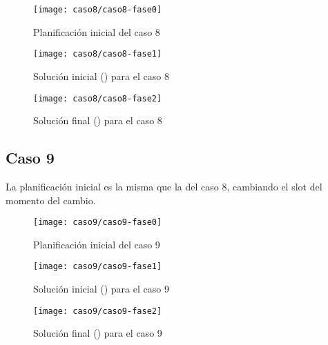 \begin{figure}[!h]
	\centering
	\texttt{[image: caso8/caso8-fase0]}
	\caption{Planificación inicial del caso 8}
	\label{fig:caso8-fase0}
\end{figure}

\begin{figure}[!h]
	\centering
	\texttt{[image: caso8/caso8-fase1]}
	\caption{Solución inicial (\faseuno{}) para el caso 8}
	\label{fig:caso8-fase1}
\end{figure}

\begin{figure}[!h]
	\centering
	\texttt{[image: caso8/caso8-fase2]}
	\caption{Solución final (\fasedos{}) para el caso 8}
	\label{fig:caso8-fase2}
\end{figure}

\FloatBarrier
\newpage
\subsection{Caso 9}

La planificación inicial es la misma que la del caso 8, cambiando el slot del momento del cambio.

\begin{figure}[!h]
	\centering
	\texttt{[image: caso9/caso9-fase0]}
	\caption{Planificación inicial del caso 9}
	\label{fig:caso9-fase0}
\end{figure}

\begin{figure}[!h]
	\centering
	\texttt{[image: caso9/caso9-fase1]}
	\caption{Solución inicial (\faseuno{}) para el caso 9}
	\label{fig:caso9-fase1}
\end{figure}

\begin{figure}[!h]
	\centering
	\texttt{[image: caso9/caso9-fase2]}
	\caption{Solución final (\fasedos{}) para el caso 9}
	\label{fig:caso9-fase2}
\end{figure}
